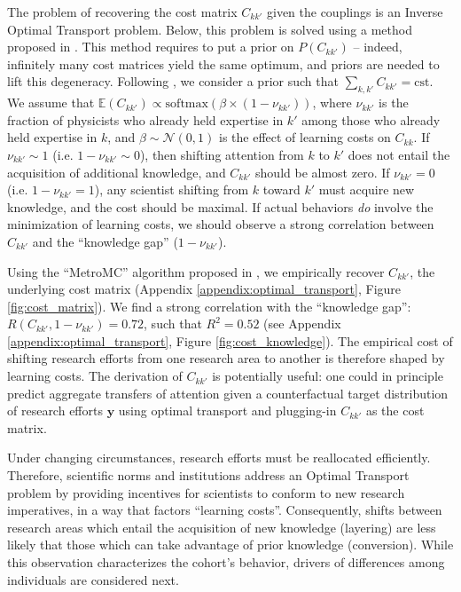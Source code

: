 \documentclass{article}
\begin{document}
The problem of recovering the cost matrix $C_{kk'}$ given the couplings is an Inverse Optimal Transport problem. Below, this problem is solved using a method proposed in \citealt{pmlr-v162-chiu22b}. %
This method requires to put a prior on $P(C_{kk'})$ -- indeed, infinitely many cost matrices yield the same optimum, and priors are needed to lift this degeneracy. Following \citealt{pmlr-v162-chiu22b}, we consider a prior such that $\sum_{k,k'}C_{kk'}=\mathrm{cst}$. We assume that $\mathbb{E}(C_{kk'})\propto \mathrm{softmax}(\beta \times (1-\nu_{kk'}))$, where $\nu_{kk'}$ is the fraction of physicists who already held expertise in $k'$ among those who already held expertise in $k$, and $\beta\sim\mathcal{N}(0,1)$ is the effect of learning costs on $C_{kk
}$. If $\nu_{kk'}\sim 1$ (i.e. $1-\nu_{kk'}\sim 0$), then shifting attention from $k$ to $k'$ does not entail the acquisition of additional knowledge, and $C_{kk'}$ should be almost zero. If $\nu_{kk'}=0$ (i.e. $1-\nu_{kk'}= 1$), any scientist shifting from $k$ toward $k'$ must acquire new knowledge, and the cost should be maximal. If actual behaviors \textit{do} involve the minimization of learning costs, we should observe a strong correlation between $C_{kk'}$ and the ``knowledge gap'' ($1-\nu_{kk'}$).

Using the ``MetroMC'' algorithm proposed in \citealt{pmlr-v162-chiu22b}, we empirically recover $C_{kk'}$, the underlying cost matrix (Appendix \ref{appendix:optimal_transport}, Figure \ref{fig:cost_matrix}). We find a strong correlation with the ``knowledge gap'': $R(C_{kk'},1-\nu_{kk'})=0.72$, such that $R^2=0.52$ (see Appendix \ref{appendix:optimal_transport}, Figure \ref{fig:cost_knowledge}). The empirical cost of shifting research efforts from one research area to another is therefore shaped by learning costs. The derivation of $C_{kk'}$ is potentially useful: one could in principle predict aggregate transfers of attention given a counterfactual target distribution of research efforts $\bm{y}$ using optimal transport and plugging-in $C_{kk'}$ as the cost matrix.

Under changing circumstances, research efforts must be reallocated efficiently. Therefore, scientific norms and institutions address an Optimal Transport problem by providing incentives for scientists to conform to new research imperatives, in a way that factors ``learning costs''. Consequently, shifts between research areas which entail the acquisition of new knowledge (layering) are less likely that those which can take advantage of prior knowledge (conversion). While this observation characterizes the cohort's behavior, drivers of differences among individuals are considered next.
\end{document}
